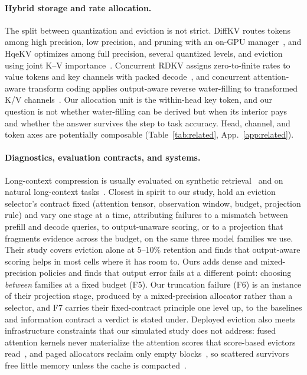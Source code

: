 \documentclass{article}
\theoremstyle{definition}
\begin{document}
\paragraph{Hybrid storage and rate allocation.}
The split between quantization and eviction is not strict.  DiffKV routes tokens among high precision, low precision, and pruning with an on-GPU manager~\citep{zhang2025diffkv}, and HqeKV optimizes among full precision, several quantized levels, and eviction using joint K--V importance~\citep{wang-etal-2026-hqekv}.  Concurrent RDKV assigns zero-to-finite rates to value tokens and key channels with packed decode~\citep{zhang2026rdkv}, and concurrent attention-aware transform coding applies output-aware reverse water-filling to transformed K/V channels~\citep{laus2026aatc}.  Our allocation unit is the within-head key token, and our question is not whether water-filling can be derived but when its interior pays and whether the answer survives the step to task accuracy.  Head, channel, and token axes are potentially composable (Table~\ref{tab:related}, App.~\ref{app:related}).

\paragraph{Diagnostics, evaluation contracts, and systems.}
Long-context compression is usually evaluated on synthetic retrieval~\citep{hsieh2024ruler} and on natural long-context tasks~\citep{bai2025longbenchv2}.  Closest in spirit to our study, \citet{zhang2026fixedcontract} hold an eviction selector's contract fixed (attention tensor, observation window, budget, projection rule) and vary one stage at a time, attributing failures to a mismatch between prefill and decode queries, to output-unaware scoring, or to a projection that fragments evidence across the budget, on the same three model families we use.  Their study covers eviction alone at 5--10\% retention and finds that output-aware scoring helps in most cells where it has room to.  Ours adds dense and mixed-precision policies and finds that output error fails at a different point: choosing \emph{between} families at a fixed budget (F5).  Our truncation failure (F6) is an instance of their projection stage, produced by a mixed-precision allocator rather than a selector, and F7 carries their fixed-contract principle one level up, to the baselines and information contract a verdict is stated under.  Deployed eviction also meets infrastructure constraints that our simulated study does not address: fused attention kernels never materialize the attention scores that score-based evictors read~\citep{dao2023flashattention2,shah2024flashattention3,zhang2024sageattention}, and paged allocators reclaim only empty blocks~\citep{kwon2023vllm}, so scattered survivors free little memory unless the cache is compacted~\citep{mao2026triattention}.
\end{document}
